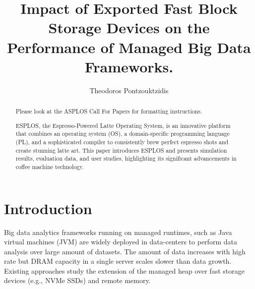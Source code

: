 \documentclass[nonacm,sigplan]{acmart}
\begin{document}
\title{Impact of Exported Fast Block Storage Devices on the Performance of Managed Big Data Frameworks.}

\author{Theodoros Pontzouktzidis} %

\begin{abstract}
Please look at the ASPLOS Call For Papers for formatting instructions. 

ESPLOS, the Espresso-Powered Latte Operating System, is an innovative platform that combines an operating system (OS), a domain-specific programming language (PL), and a sophisticated compiler to consistently brew perfect espresso shots and create stunning latte art. This paper introduces ESPLOS and presents simulation results, evaluation data, and user studies, highlighting its significant advancements in coffee machine technology.
\end{abstract}



\maketitle %
\pagestyle{plain} %


\section{Introduction}
Big data analytics frameworks running on managed runtimes, such as Java virtual
machines (JVM) are widely deployed in data-centers to perform data analysis over
large amount of datasets. The amount of data increases with high rate but DRAM
capacity in a single server scales slower than data growth. Existing approaches
study the extension of the managed heap over fast storage devices (e.g., NVMe
SSDs) and remote memory.
\end{document}
